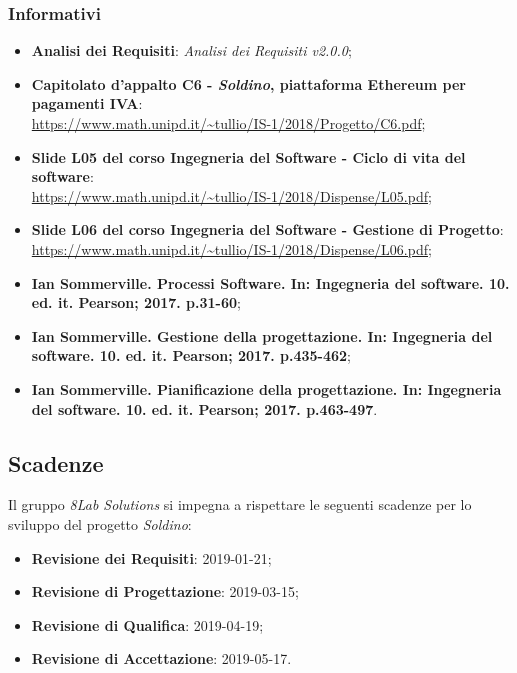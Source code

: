 \subsubsection{Informativi}
\begin{itemize}
	
	\item \textbf{Analisi dei Requisiti}:
	\textit{Analisi dei Requisiti v2.0.0};
	\item \textbf{Capitolato d'appalto C6 - \textit{Soldino}, piattaforma Ethereum per pagamenti IVA}: \\
	\url{https://www.math.unipd.it/~tullio/IS-1/2018/Progetto/C6.pdf};
	\item \textbf{Slide L05 del corso Ingegneria del Software - Ciclo di vita 
		del software}:\\
	\url{https://www.math.unipd.it/~tullio/IS-1/2018/Dispense/L05.pdf};
	\item \textbf{Slide L06 del corso Ingegneria del Software - Gestione di 
	Progetto}: \\
	\url{https://www.math.unipd.it/~tullio/IS-1/2018/Dispense/L06.pdf};
		
	\item \textbf{Ian Sommerville. Processi Software. In: Ingegneria del software.
	10. ed. it. Pearson; 2017. p.31-60};
	\item \textbf{Ian Sommerville. Gestione della progettazione. In: Ingegneria del software.
	10. ed. it. Pearson; 2017. p.435-462};
	\item \textbf{Ian Sommerville. Pianificazione della progettazione. In: Ingegneria del software.
	10. ed. it. Pearson; 2017. p.463-497}.
\end{itemize}

\hypertarget{scadenze}{\subsection{Scadenze}}
Il gruppo \textit{8Lab Solutions} si impegna a rispettare le seguenti scadenze per lo 
sviluppo del progetto \textit{Soldino}:

\begin{itemize}
	\item \textbf{Revisione dei Requisiti}: 2019-01-21;
	\item \textbf{Revisione di Progettazione}: 2019-03-15;
	\item \textbf{Revisione di Qualifica}: 2019-04-19;
	\item \textbf{Revisione di Accettazione}: 2019-05-17.
\end{itemize}